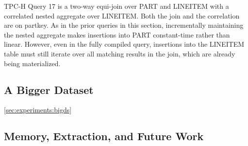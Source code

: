 TPC-H Query 17 is a two-way equi-join over PART and LINEITEM with a correlated nested aggregate over LINEITEM.  Both the join and the correlation are on partkey.  As in the prior queries in this section, incrementally maintaining the nested aggregate makes insertions into PART constant-time rather than linear.  However, even in the fully compiled query, insertions into the LINEITEM table must still iterate over all matching results in the join, which are already being materialized.  

\subsection{A Bigger Dataset}
\ref{sec:experiments:bigds}


\subsection{Memory, Extraction, and Future Work}
\label{sec:experiments:future}

